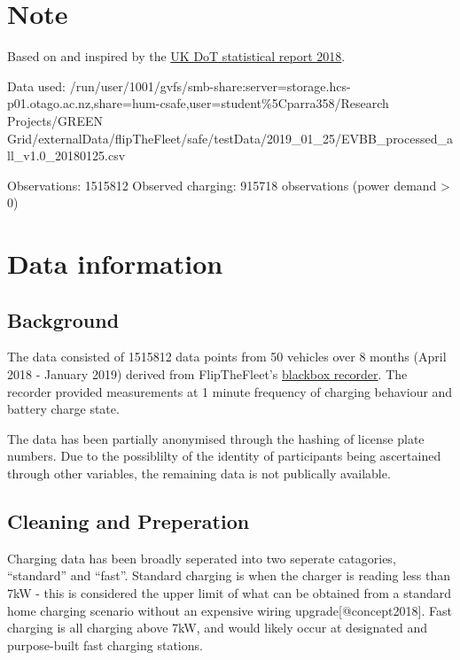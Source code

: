 \documentclass[]{article}
\begin{document}
\section{Note}\label{note}

Based on and inspired by the
\href{https://assets.publishing.service.gov.uk/government/uploads/system/uploads/attachment_data/file/764270/electric-chargepoint-analysis-2017-domestics.pdf}{UK
DoT statistical report 2018}.

Data used:
/run/user/1001/gvfs/smb-share:server=storage.hcs-p01.otago.ac.nz,share=hum-csafe,user=student\%5Cparra358/Research
Projects/GREEN
Grid/externalData/flipTheFleet/safe/testData/2019\_01\_25/EVBB\_processed\_all\_v1.0\_20180125.csv

Observations: 1515812 Observed charging: 915718 observations (power
demand \textgreater{} 0)

\section{Data information}\label{data}

\subsection{Background}\label{background}

The data consisted of 1515812 data points from 50 vehicles over 8 months
(April 2018 - January 2019) derived from FlipTheFleet's
\href{https://flipthefleet.org/ev-black-box/}{blackbox recorder}. The
recorder provided measurements at 1 minute frequency of charging
behaviour and battery charge state.

The data has been partially anonymised through the hashing of license
plate numbers. Due to the possiblilty of the identity of participants
being ascertained through other variables, the remaining data is not
publically available.

\subsection{Cleaning and Preperation}\label{cleaning-and-preperation}

Charging data has been broadly seperated into two seperate catagories,
``standard'' and ``fast''. Standard charging is when the charger is
reading less than 7kW - this is considered the upper limit of what can
be obtained from a standard home charging scenario without an expensive
wiring upgrade{[}@concept2018{]}. Fast charging is all charging above
7kW, and would likely occur at designated and purpose-built fast
charging stations.
\end{document}
